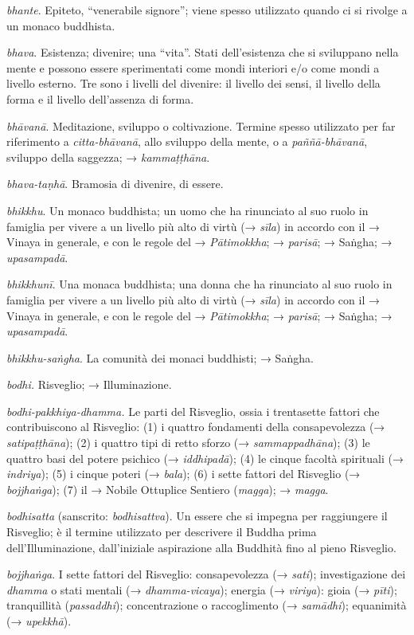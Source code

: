 \emph{bhante}. Epiteto, ``venerabile signore''; viene spesso utilizzato
quando ci si rivolge a un monaco buddhista.

\emph{bhava}. Esistenza; divenire; una ``vita''. Stati dell'esistenza
che si sviluppano nella mente e possono essere sperimentati come mondi
interiori e/o come mondi a livello esterno. Tre sono i livelli del
divenire: il livello dei sensi, il livello della forma e il livello
dell'assenza di forma.

\emph{bhāvanā}. Meditazione, sviluppo o coltivazione. Termine spesso
utilizzato per far riferimento a \emph{citta-bhāvanā}, allo sviluppo
della mente, o a \emph{paññā-bhāvanā}, sviluppo della saggezza; →
\emph{kammaṭṭhāna}.

\emph{bhava-taṇhā}. Bramosia di divenire, di essere.

\emph{bhikkhu}. Un monaco buddhista; un uomo che ha rinunciato al suo
ruolo in famiglia per vivere a un livello più alto di virtù (→
\emph{sīla}) in accordo con il → Vinaya in generale, e con le regole del
→ \emph{Pātimokkha}; → \emph{parisā}; → Saṅgha; → \emph{upasampadā}.

\emph{bhikkhunī}. Una monaca buddhista; una donna che ha rinunciato al
suo ruolo in famiglia per vivere a un livello più alto di virtù (→
\emph{sīla}) in accordo con il → Vinaya in generale, e con le regole del
→ \emph{Pātimokkha}; → \emph{parisā}; → Saṅgha; → \emph{upasampadā}.

\emph{bhikkhu-saṅgha}. La comunità dei monaci buddhisti; → Saṅgha.

\emph{bodhi.} Risveglio; → Illuminazione.

\emph{bodhi-pakkhiya-dhamma.} Le parti del Risveglio, ossia i
trentasette fattori che contribuiscono al Risveglio: (1) i quattro
fondamenti della consapevolezza (→ \emph{satipaṭṭhāna}); (2) i quattro
tipi di retto sforzo (→ \emph{sammappadhāna}); (3) le quattro basi del
potere psichico (→ \emph{iddhipadā}); (4) le cinque facoltà spirituali
(→ \emph{indriya}); (5) i cinque poteri (→ \emph{bala}); (6) i sette
fattori del Risveglio (→ \emph{bojjhaṅga}); (7) il → Nobile Ottuplice
Sentiero (\emph{magga}); → \emph{magga}.

\emph{bodhisatta} (sanscrito: \emph{bodhisattva}). Un essere che si
impegna per raggiungere il Risveglio; è il termine utilizzato per
descrivere il Buddha prima dell'Illuminazione, dall'iniziale aspirazione
alla Buddhità fino al pieno Risveglio.

\emph{bojjhaṅga}. I sette fattori del Risveglio: consapevolezza (→
\emph{sati}); investigazione dei \emph{dhamma} o stati mentali (→
\emph{dhamma-vicaya}); energia (→ \emph{viriya}): gioia (→ \emph{pīti});
tranquillità (\emph{passaddhi}); concentrazione o raccoglimento (→
\emph{samādhi}); equanimità (→ \emph{upekkhā}).

